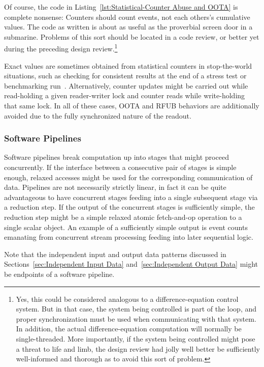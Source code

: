 \documentclass[10]{article}
\begin{document}
Of course, the code in
Listing~\ref{lst:Statistical-Counter Abuse and OOTA}
is complete nonsense: Counters should count events, not each others's
cumulative values.
The code as written is about as useful as the proverbial screen door in
a submarine.
Problems of this sort should be located in a code review, or better yet
during the preceding design review.\footnote{
	Yes, this could be considered analogous to a difference-equation
	control system.
	But in that case, the system being controlled is part of the
	loop, and proper synchronization must be used when communicating
	with that system.
	In addition, the actual difference-equation computation will
	normally be single-threaded.
	More importantly, if the system being controlled might pose a threat
	to life and limb, the design review had jolly well better be
	sufficiently well-informed and thorough as to avoid this sort
	of problem.}

Exact values are sometimes obtained from statistical counters in
stop-the-world situations, such as checking for consistent results
at the end of a stress test or benchmarking
run~\cite[Sections 5.3 and 5.4]{McKenney2018ParallelProgramming-2018-12-08a}.
Alternatively, counter updates might be carried out while read-holding
a given reader-writer lock and counter reads while write-holding
that same lock.
In all of these cases, OOTA and RFUB behaviors are additionally avoided due
to the fully synchronized nature of the readout.

\subsubsection{Software Pipelines}
\label{sec:Software Pipelines}

Software pipelines break computation up into stages that might proceed
concurrently.
If the interface between a consecutive pair of stages is simple enough,
relaxed accesses might be used for the corresponding communication of data.
Pipelines are not necessarily strictly linear, in fact it can be quite
advantageous to have concurrent stages feeding into a single subsequent
stage via a reduction step.
If the output of the concurrent stages is sufficiently simple, the
reduction step might be a simple relaxed atomic fetch-and-op operation
to a single scalar object.
An example of a sufficiently simple output is event counts emanating from
concurrent stream processing feeding into later sequential logic.

Note that the independent input and output data patterns discussed in
Sections~\ref{sec:Independent Input Data} and~\ref{sec:Independent Output Data}
might be endpoints of a software pipeline.
\end{document}
